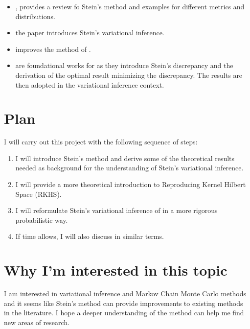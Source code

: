 \documentclass[]{STAT_547C}
\begin{document}
\begin{itemize}
  \item \cite{ross2011fundamentals}, provides a review fo Stein's method and examples for different metrics and distributions.
  \item \cite{liu2016stein} the paper introduces Stein's variational inference.
  \item \cite{zhuo2017message} improves the method of \citet{liu2016stein}.
  \item \cite{liu2016kernelized, chwialkowski2016kernel} are foundational works for \cite{liu2016stein} as they introduce Stein's discrepancy and the derivation of the optimal result minimizing the discrepancy. The results are then adopted in the variational inference context.
\end{itemize}


\section{Plan}

I will carry out this project with the following sequence of steps: 
\begin{enumerate}
  \item I will introduce Stein's method and derive some of the theoretical results needed as background for the understanding of Stein's variational inference.
  \item I will provide a more theoretical introduction to Reproducing Kernel Hilbert Space (RKHS).
  \item I will reformulate Stein's variational inference of \citet{liu2016stein} in a more rigorous probabilistic way. 
  \item If time allows, I will also discuss \citet{zhuo2017message} in similar terms. 
\end{enumerate}


\section{Why I'm interested in this topic}

I am interested in variational inference and Markov Chain Monte Carlo methods and it seems like Stein's method can provide improvements to existing methods in the literature. I hope a deeper understanding of the method can help me find new areas of research.

\printbibliography
\end{document}
